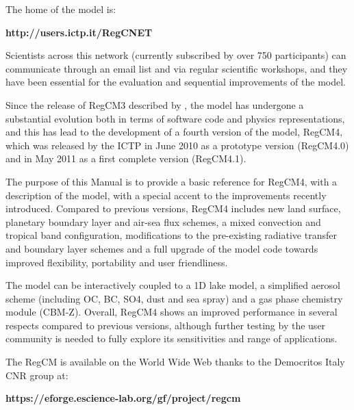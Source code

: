 The home of the model is:

\begin{center}
{\bf http://users.ictp.it/RegCNET}
\end{center}

Scientists across this network (currently subscribed by over 750 participants)
can communicate through an email list and via regular scientific workshops,
and they have been essential for the evaluation and sequential improvements of
the model.

Since the release of \ac{RegCM}3 described by \cite{Pal_07}, the model has undergone
a substantial evolution both in terms of software code and physics
representations, and this has lead to the development of a fourth version of
the model, \ac{RegCM}4, which was released by the ICTP in June 2010 as a prototype
version (\ac{RegCM}4.0) and in May 2011 as a first complete version (\ac{RegCM}4.1).

The purpose of this Manual is to provide a basic reference for \ac{RegCM}4, with
a description of the model, with a special accent to the improvements
recently introduced.
Compared to previous versions, \ac{RegCM}4 includes new land surface, planetary
boundary layer and air-sea flux schemes, a mixed convection and tropical band
configuration, modifications to the pre-existing radiative transfer and
boundary layer schemes and a full upgrade of the model code towards improved
flexibility, portability and user friendliness.

The model can be interactively coupled to a 1D lake model, a simplified aerosol
scheme (including OC, BC, SO4, dust and sea spray) and a gas phase chemistry
module (CBM-Z). Overall, \ac{RegCM}4 shows an improved performance in several
respects compared to previous versions, although further testing by the user
community is needed to fully explore its sensitivities and range of
applications.

The \ac{RegCM} is available on the World Wide Web thanks to the Democritos
Italy CNR group at:

\begin{center}
{\bf https://eforge.escience-lab.org/gf/project/regcm}
\end{center}

